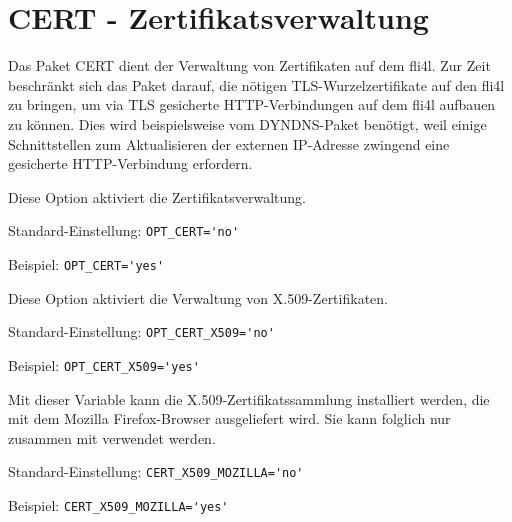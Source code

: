{
\section{CERT - Zertifikatsverwaltung}
}

    Das Paket CERT dient der Verwaltung von Zertifikaten auf dem fli4l. Zur
    Zeit beschränkt sich das Paket darauf, die nötigen TLS-Wurzelzertifikate
    auf den fli4l zu bringen, um via TLS gesicherte HTTP-Verbindungen auf dem
    fli4l aufbauen zu können. Dies wird beispielsweise vom DYNDNS-Paket
    benötigt, weil einige Schnittstellen zum Aktualisieren der externen
    IP-Adresse zwingend eine gesicherte HTTP-Verbindung erfordern.

\begin{description}


    Diese Option aktiviert die Zertifikatsverwaltung.

    Standard-Einstellung: \verb+OPT_CERT='no'+

    Beispiel: \verb+OPT_CERT='yes'+


    Diese Option aktiviert die Verwaltung von X.509-Zertifikaten.
    

    Standard-Einstellung: \verb+OPT_CERT_X509='no'+

    Beispiel: \verb+OPT_CERT_X509='yes'+


    Mit dieser Variable kann die X.509-Zertifikatssammlung installiert werden,
    die mit dem Mozilla Firefox-Browser ausgeliefert wird. Sie kann folglich
    nur zusammen mit  verwendet werden.

    Standard-Einstellung: \verb+CERT_X509_MOZILLA='no'+

    Beispiel: \verb+CERT_X509_MOZILLA='yes'+

\end{description}
